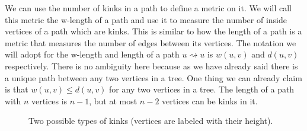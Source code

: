 We can use the number of kinks in a path to define a metric on it. We will call this metric the w-length of a path and use it to measure the number of inside vertices of a path which are kinks. This is similar to how the length of a path is a metric that measures the number of edges between its vertices. The notation we will adopt for the w-length and length of a path $u \rightsquigarrow u$ is $w(u, v)$ and $d(u, v)$ respectively. There is no ambiguity here because as we have already said there is a unique path between any two vertices in a tree. One thing we can already claim is that $w(u, v) \le d(u, v)$ for any two vertices in a tree. The length of a path with $n$ vertices is $n-1$, but at most $n-2$ vertices can be kinks in it.

\begin{figure}[h]%
    \centering
    \qquad \qquad \qquad
    \caption{Two possible types of kinks (vertices are labeled with their height).}%
    \label{fig:a-tale-of-two-kinks}%
\end{figure}


